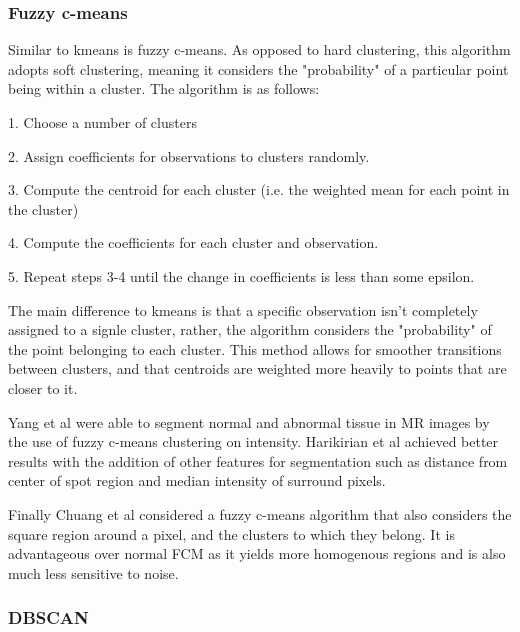 \documentclass[a4]{article}
\begin{document}
 

\subsubsection*{Fuzzy c-means}

Similar to kmeans is fuzzy c-means. As opposed to hard clustering, this algorithm adopts soft clustering, meaning it considers the "probability" of a particular point being within a cluster. The algorithm is as follows: 

  

1. Choose a number of clusters 

2. Assign coefficients for observations to clusters randomly. 

3. Compute the centroid for each cluster (i.e. the weighted mean for each point in the cluster) 

4. Compute the coefficients for each cluster and observation. 

5. Repeat steps 3-4 until the change in coefficients is less than some epsilon. 

  

The main difference to kmeans is that a specific observation isn't completely assigned to a signle cluster, rather, the algorithm considers the "probability" of the point belonging to each cluster. This method allows for smoother transitions between clusters, and that centroids are weighted more heavily to points that are closer to it. 

  

Yang et al \cite{yang2002segmentation} were able to segment normal and abnormal tissue in MR images by the use of fuzzy c-means clustering on intensity. Harikirian et al \cite{harikiran2015multiple} achieved better results with the addition of other features for segmentation such as distance from center of spot region and median intensity of surround pixels. 

  

Finally Chuang et al \cite{chuang2006fuzzy} considered a fuzzy c-means algorithm that also considers the square region around a pixel, and the clusters to which they belong. It is advantageous over normal FCM as it yields more homogenous regions and is also much less sensitive to noise. 

 

\subsubsection*{DBSCAN}
\end{document}
